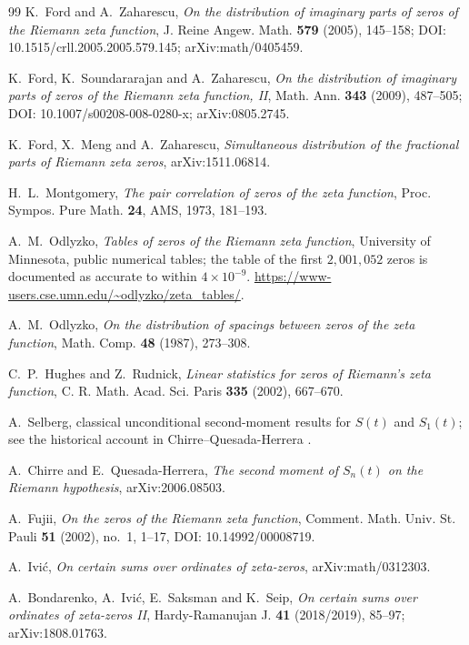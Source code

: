 \documentclass[11pt]{amsart}
\numberwithin{equation}{section}
\theoremstyle{definition}
\theoremstyle{remark}
\begin{document}
\begin{thebibliography}{99}
K.~Ford and A.~Zaharescu,
\emph{On the distribution of imaginary parts of zeros of the Riemann zeta function},
J. Reine Angew. Math. \textbf{579} (2005), 145--158;
DOI: 10.1515/crll.2005.2005.579.145; arXiv:math/0405459.

K.~Ford, K.~Soundararajan and A.~Zaharescu,
\emph{On the distribution of imaginary parts of zeros of the Riemann zeta function, II},
Math. Ann. \textbf{343} (2009), 487--505;
DOI: 10.1007/s00208-008-0280-x; arXiv:0805.2745.

K.~Ford, X.~Meng and A.~Zaharescu,
\emph{Simultaneous distribution of the fractional parts of Riemann zeta zeros},
arXiv:1511.06814.

H.~L.~Montgomery,
\emph{The pair correlation of zeros of the zeta function},
Proc. Sympos. Pure Math. \textbf{24}, AMS, 1973, 181--193.

A.~M.~Odlyzko,
\emph{Tables of zeros of the Riemann zeta function},
University of Minnesota, public numerical tables; the table of the first
$2{,}001{,}052$ zeros is documented as accurate to within $4\times10^{-9}$.
\url{https://www-users.cse.umn.edu/~odlyzko/zeta_tables/}.

A.~M.~Odlyzko,
\emph{On the distribution of spacings between zeros of the zeta function},
Math. Comp. \textbf{48} (1987), 273--308.

C.~P.~Hughes and Z.~Rudnick,
\emph{Linear statistics for zeros of Riemann's zeta function},
C. R. Math. Acad. Sci. Paris \textbf{335} (2002), 667--670.

A.~Selberg,
classical unconditional second-moment results for $S(t)$ and $S_1(t)$;
see the historical account in Chirre--Quesada-Herrera \cite{ChirreQuesada2020}.

A.~Chirre and E.~Quesada-Herrera,
\emph{The second moment of $S_n(t)$ on the Riemann hypothesis},
arXiv:2006.08503.

A.~Fujii,
\emph{On the zeros of the Riemann zeta function},
Comment. Math. Univ. St. Pauli \textbf{51} (2002), no.~1, 1--17,
DOI: 10.14992/00008719.

A.~Ivić,
\emph{On certain sums over ordinates of zeta-zeros},
arXiv:math/0312303.

A.~Bondarenko, A.~Ivić, E.~Saksman and K.~Seip,
\emph{On certain sums over ordinates of zeta-zeros II},
Hardy-Ramanujan J. \textbf{41} (2018/2019), 85--97;
arXiv:1808.01763.


\end{thebibliography}
\end{document}
